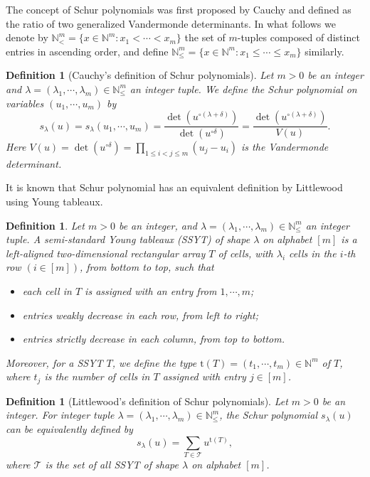 \documentclass[10pt,a4paper]{article}
\newtheorem{definition}[theorem]{Definition}
\theoremstyle{remark}
\numberwithin{equation}{section}
\numberwithin{theorem}{section}
\newcommand{\N}{\ensuremath{\mathbb{N}}}
\begin{document}
The concept of Schur polynomials was first proposed by Cauchy and defined as the ratio of two generalized Vandermonde determinants. In what follows we denote by $\N^m_< = \{x \in \N^m: x_1 < \cdots < x_m\}$ the set of $m$-tuples composed of distinct entries in ascending order, and define $\N^m_{\le} = \{x \in \N^m: x_1 \le \cdots \le x_m\}$ similarly.
\begin{definition}[Cauchy's definition of Schur polynomials]
Let $m>0$ be an integer and $\lambda = (\lambda_1, \cdots, \lambda_m) \in \N^m_{\le}$ an integer tuple.
We define the Schur polynomial on variables $(u_1, \cdots, u_m)$ by
\[s_{\lambda}(u) = s_{\lambda}(u_1, \cdots, u_m)
=\frac{\det(u^{\circ (\lambda + \delta)})}{\det(u^{\circ \delta})}
=\frac{\det(u^{\circ (\lambda + \delta)})}{V(u)}.\]
Here $V(u) = \det(u^{\circ \delta}) = \prod_{1 \le i < j \le m}(u_j - u_i)$ is the Vandermonde determinant.
\end{definition}

It is known that Schur polynomial has an equivalent definition by Littlewood using Young tableaux.
\begin{definition}
Let $m > 0$ be an integer, and $\lambda = (\lambda_1, \cdots, \lambda_m) \in \N^m_{\le}$ an integer tuple.
A semi-standard Young tableaux (SSYT) of shape $\lambda$ on alphabet $[m]$
is a left-aligned two-dimensional rectangular array $T$ of cells,
with $\lambda_i$ cells in the $i$-th row $(i \in [m])$, from bottom to top, such that
\begin{itemize}
\item each cell in $T$ is assigned with an entry from $1, \cdots, m$;
\item entries weakly decrease in each row, from left to right;
\item entries strictly decrease in each column, from top to bottom.
\end{itemize}
Moreover, for a SSYT $T$, we define the type $\mathrm t(T) = (t_1, \cdots, t_m) \in \N^m$ of $T$,
where $t_j$ is the number of cells in $T$ assigned with entry $j \in [m]$.
\end{definition}
\begin{definition}[Littlewood's definition of Schur polynomials]
Let $m > 0$ be an integer.
For integer tuple $\lambda = (\lambda_1, \cdots, \lambda_m) \in \N_{\le}^m$,
the Schur polynomial $s_{\lambda}(u)$ can be equivalently defined by
\[s_{\lambda}(u) = \sum_{T \in \mathcal T} u^{\mathrm t(T)},\]
where $\mathcal T$ is the set of all SSYT of shape $\lambda$ on alphabet $[m]$.
\end{definition}
\end{document}
